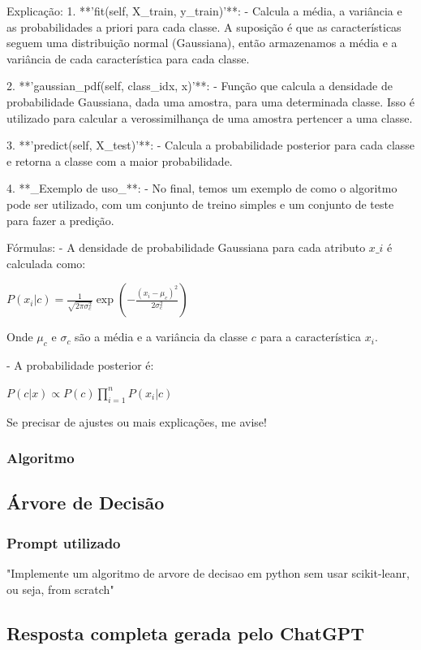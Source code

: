\documentclass[12pt]{article}
\begin{document}
Explicação:
1. **'fit(self, X\_train, y\_train)'**:
   - Calcula a média, a variância e as probabilidades a priori para cada classe. A suposição é que as características seguem uma distribuição normal (Gaussiana), então armazenamos a média e a variância de cada característica para cada classe.
   
2. **'gaussian\_pdf(self, class\_idx, x)'**:
   - Função que calcula a densidade de probabilidade Gaussiana, dada uma amostra, para uma determinada classe. Isso é utilizado para calcular a verossimilhança de uma amostra pertencer a uma classe.

3. **'predict(self, X\_test)'**:
   - Calcula a probabilidade posterior para cada classe e retorna a classe com a maior probabilidade.

4. **\_Exemplo de uso\_**:
   - No final, temos um exemplo de como o algoritmo pode ser utilizado, com um conjunto de treino simples e um conjunto de teste para fazer a predição.

Fórmulas:
- A densidade de probabilidade Gaussiana para cada atributo \( x\_i \) é calculada como:

  $P(x_i|c) = \frac{1}{\sqrt{2\pi \sigma_c^2}} \exp\left(-\frac{(x_i - \mu_c)^2}{2\sigma_c^2}\right)$
  
  Onde \( \mu_c \) e \( \sigma_c \) são a média e a variância da classe \( c \) para a característica \( x_i \).
  
- A probabilidade posterior é:

  $ P(c|x) \propto P(c) \prod_{i=1}^{n} P(x_i|c) $
  
 Se precisar de ajustes ou mais explicações, me avise!

\subsubsection{Algoritmo}


\subsection{Árvore de Decisão}
\subsubsection{Prompt utilizado}
"Implemente um algoritmo de arvore de decisao em python sem usar scikit-leanr, ou seja, from scratch"

\subsection{Resposta completa gerada pelo ChatGPT}
\end{document}
